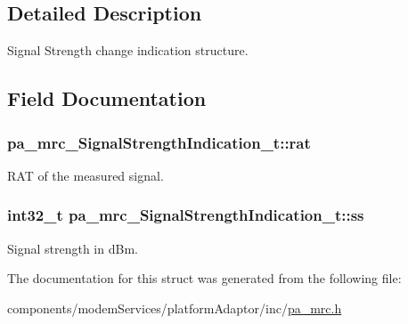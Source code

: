 \subsection{Detailed Description}
Signal Strength change indication structure. 

\subsection{Field Documentation}
\subsubsection[{\texorpdfstring{rat}{rat}}]{ pa\+\_\+mrc\+\_\+\+Signal\+Strength\+Indication\+\_\+t\+::rat}\hypertarget{structpa__mrc___signal_strength_indication__t_acbe1e5f253485ca33260e032e6e575b5}{}\label{structpa__mrc___signal_strength_indication__t_acbe1e5f253485ca33260e032e6e575b5}


R\+AT of the measured signal. 

\subsubsection[{\texorpdfstring{ss}{ss}}]{\setlength{\rightskip}{0pt plus 5cm}int32\+\_\+t pa\+\_\+mrc\+\_\+\+Signal\+Strength\+Indication\+\_\+t\+::ss}\hypertarget{structpa__mrc___signal_strength_indication__t_a73f58b501a295db9ff6f24608be043ca}{}\label{structpa__mrc___signal_strength_indication__t_a73f58b501a295db9ff6f24608be043ca}


Signal strength in d\+Bm. 



The documentation for this struct was generated from the following file\+:\begin{DoxyCompactItemize}
\item 
components/modem\+Services/platform\+Adaptor/inc/\hyperlink{pa__mrc_8h}{pa\+\_\+mrc.\+h}\end{DoxyCompactItemize}
